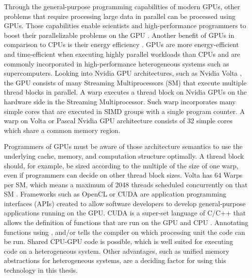 Through the general-purpose programming capabilities of modern GPUs, other problems that require processing large data in parallel can be processed using GPUs. Those capabilities enable scientists and high-performance programmers to boost their parallelizable problems on the GPU \cite{cohenSolvingComputationalProblems2009,nickollsScalableParallelProgramming2008,stoneAcceleratingMolecularModeling2007}.
Another benefit of GPUs in comparison to CPUs is their energy efficiency \cite{qasaimehComparingEnergyEfficiency2019}. GPUs are more energy-efficient and time-efficient when executing highly parallel workloads than CPUs and are commonly incorporated in high-performance heterogeneous systems such as supercomputers.
Looking into Nvidia GPU architectures, such as Nvidia Volta \cite{NVIDIATESLAV1002017}, the GPU consists of many Streaming Multiprocessors (SM) that execute multiple thread blocks in parallel. A warp executes a thread block on Nvidia GPUs on the hardware side in the Streaming Multiprocessor. Such warp incorporates many simple cores that are executed in SIMD groups with a single program counter. A warp on Volta or Pascal Nvidia GPU architecture consists of 32 simple cores which share a common memory region.

Programmers of GPUs must be aware of those architecture semantics to use the underlying cache, memory, and computation structure optimally. A thread block should, for example, be sized according to the multiple of the size of one warp, even if programmers can decide on other thread block sizes. Volta has 64 Warps per SM, which means a maximum of 2048 threads scheduled concurrently on that SM \cite{NVIDIATESLAV1002017}.
Frameworks such as OpenCL or CUDA are application programming interfaces (APIs) created to allow software developers to develop general-purpose applications running on the GPU. CUDA is a super-set language of C/C++ that allows the definition of functions that are run on the GPU and CPU \cite{EasyIntroductionCUDA2012,nickollsScalableParallelProgramming2008,sosuthaHeterogeneousParallelComputing2015}. Annotating functions using \texttt{}, \texttt{} and/or \texttt{} tells the compiler on which processing unit the code can be run. Shared CPU-GPU code is possible, which is well suited for executing code on a heterogeneous system. Other advantages, such as unified memory abstractions for heterogeneous systems, are a deciding factor for using this technology in this thesis.


